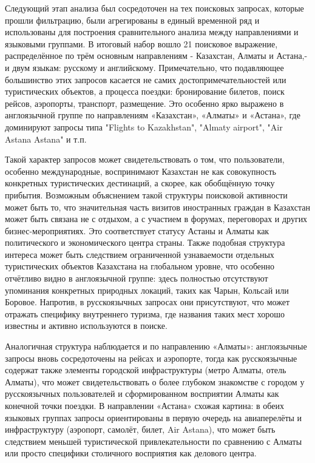 \begin{multicols}{2}
Следующий этап анализа был сосредоточен на тех поисковых запросах,
которые прошли фильтрацию, были агрегированы в единый временной ряд и
использованы для построения сравнительного анализа между направлениями и
языковыми группами. В итоговый набор вошло 21 поисковое выражение,
распределённое по трём основным направлениям - Казахстан, Алматы и
Астана,- и двум языкам: русскому и английскому. Примечательно, что
подавляющее большинство этих запросов касается не самих
достопримечательностей или туристических объектов, а процесса поездки:
бронирование билетов, поиск рейсов, аэропорты, транспорт, размещение.
Это особенно ярко выражено в англоязычной группе по направлениям
«Казахстан», «Алматы» и «Астана», где доминируют запросы типа "Flights
to Kazakhstan", "Almaty airport", "Air Astana Astana" и т.п.

Такой характер запросов может свидетельствовать о том, что пользователи,
особенно международные, воспринимают Казахстан не как совокупность
конкретных туристических дестинаций, а скорее, как обобщённую точку
прибытия. Возможным объяснением такой структуры поисковой активности
может быть то, что значительная часть визитов иностранных граждан в
Казахстан может быть связана не с отдыхом, а с участием в форумах,
переговорах и других бизнес-мероприятиях. Это соответствует статусу
Астаны и Алматы как политического и экономического центра страны. Также
подобная структура интереса может быть следствием ограниченной
узнаваемости отдельных туристических объектов Казахстана на глобальном
уровне, что особенно отчётливо видно в англоязычной группе: здесь
полностью отсутствуют упоминания конкретных природных локаций, таких как
Чарын, Кольсай или Боровое. Напротив, в русскоязычных запросах они
присутствуют, что может отражать специфику внутреннего туризма, где
названия таких мест хорошо известны и активно используются в поиске.

Аналогичная структура наблюдается и по направлению «Алматы»:
англоязычные запросы вновь сосредоточены на рейсах и аэропорте, тогда
как русскоязычные содержат также элементы городской инфраструктуры
(метро Алматы, отель Алматы), что может свидетельствовать о более
глубоком знакомстве с городом у русскоязычных пользователей и
сформированном восприятии Алматы как конечной точки поездки. В
направлении «Астана» схожая картина: в обеих языковых группах запросы
ориентированы в первую очередь на авиаперелёты и инфраструктуру
(аэропорт, самолёт, билет, Air Astana), что может быть следствием
меньшей туристической привлекательности по сравнению с Алматы или просто
специфики столичного восприятия как делового центра.


\end{multicols}
